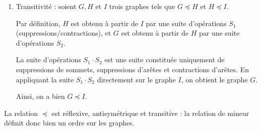 \begin{td-sol}[]
\begin{enumerate}
        Et d'autre part :
        \begin{equation*}
            \begin{aligned}
                \hphantom{\implies} & m(G) \leq m(H) \quad \text{et} \quad m(H) \leq m(G) \\
                \implies & m(G) \leq m(H) \leq m(G) \\
                \implies & m(G) = m(H).
            \end{aligned}
        \end{equation*}

        Puisque \(n(G) = n(H)\) et \(m(G) = m(H)\), aucune opération modifiant le nombre de sommets ou d'arêtes n'a pu être appliquée pour passer de \(G\) à \(H\) (et réciproquement). La suite d'opérations permettant d'obtenir \(G\) à partir de \(H\) est donc nécessairement vide, ce qui implique que \(G\) et \(H\) sont identiques.
        Ainsi, on a bien \(G = H\).

        \item Transitivit\'e : soient \(G, H\) et \(I\) trois graphes tels que \(G \preccurlyeq H\) et \(H \preccurlyeq I\).
        
        Par d\'efinition, \(H\) est obtenu à partir de \(I\) par une suite d'opérations \(S_1\) (suppressions/contractions), et \(G\) est obtenu à partir de \(H\) par une suite d'opérations \(S_2\).
        
        La suite d'opérations \(S_1 \cdot S_2\) est une suite constituée uniquement de suppressions de sommets, suppressions d'arêtes et contractions d'arêtes. En appliquant la suite \(S_1 \cdot S_2\) directement sur le graphe \(I\), on obtient le graphe \(G\).
        
        Ainsi, on a bien \(G \preccurlyeq I\).
    \end{enumerate}

    La relation \(\preccurlyeq\) est r\'eflexive, antisym\'etrique et transitive : la relation de mineur d\'efinit donc bien un ordre sur les graphes.
\end{td-sol}
